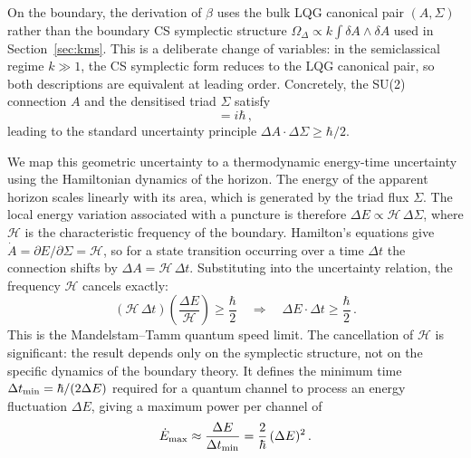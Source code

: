 \documentclass[aps,prd,twocolumn,10pt,superscriptaddress,nofootinbib]{revtex4-2}
\begin{document}
On the boundary, the derivation of $\beta$ uses the bulk
LQG canonical pair $(A, \Sigma)$ rather than the boundary CS
symplectic structure $\Omega_\Delta \propto k\int\delta A\wedge\delta A$
used in Section~\ref{sec:kms}.  This is a deliberate change of
variables: in the semiclassical regime $k \gg 1$, the CS
symplectic form reduces to the LQG canonical pair, so both
descriptions are equivalent at leading order.  Concretely, the
SU(2) connection $A$ and the densitised triad $\Sigma$ satisfy
\begin{equation}
[\hat{A},\,\hat{\Sigma}] = i\hbar\,,
\label{eq:uncertainty_AS}
\end{equation}
leading to the standard uncertainty principle
$\Delta A \cdot \Delta\Sigma \geq \hbar/2$.

We map this geometric uncertainty to a thermodynamic energy-time
uncertainty using the Hamiltonian dynamics of the horizon.  The
energy of the apparent horizon scales linearly with its area,
which is generated by the triad flux $\Sigma$.  The local energy
variation associated with a puncture is therefore
$\Delta E \propto \mathcal{H}\,\Delta\Sigma$, where
$\mathcal{H}$ is the characteristic frequency of the boundary.
Hamilton's equations give
$\dot{A} = \partial E/\partial\Sigma = \mathcal{H}$, so for a
state transition occurring over a time $\Delta t$ the connection
shifts by $\Delta A = \mathcal{H}\,\Delta t$.  Substituting into
the uncertainty relation, the frequency $\mathcal{H}$ cancels
exactly:
\begin{equation}
(\mathcal{H}\,\Delta t)
  \left(\frac{\Delta E}{\mathcal{H}}\right) \geq \frac{\hbar}{2}
  \quad\Longrightarrow\quad
  \Delta E \cdot \Delta t \geq \frac{\hbar}{2}\,.
\label{eq:mandelstam_tamm}
\end{equation}
This is the Mandelstam--Tamm quantum speed limit.  The
cancellation of $\mathcal{H}$ is significant: the result depends
only on the symplectic structure, not on the specific dynamics of
the boundary theory.  It defines the minimum time
$\Delta t_{\rm min} = \hbar/(2\Delta E)$ required for a quantum
channel to process an energy fluctuation $\Delta E$, giving a
maximum power per channel of
\begin{equation}
\dot{E}_{\rm max}
  \approx \frac{\Delta E}{\Delta t_{\rm min}}
  = \frac{2}{\hbar}\,(\Delta E)^2\,.
\label{eq:power_limit}
\end{equation}
\end{document}
